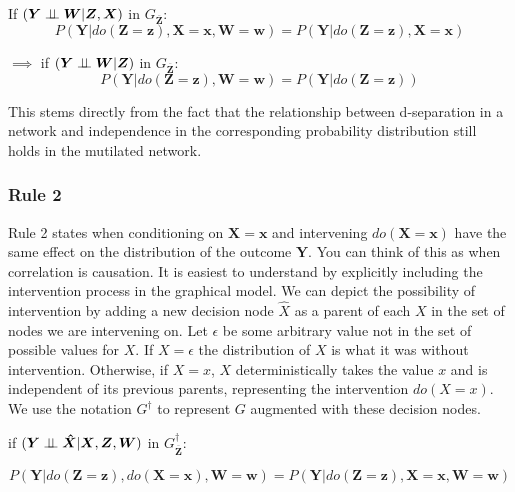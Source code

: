 \documentclass[11pt,a4paper]{article}
\begin{document}
If $(\boldsymbol{Y} \perp\!\!\!\perp \boldsymbol{W} | \boldsymbol{Z},\boldsymbol{X})$ in $G_{\overline{\boldsymbol{Z}}}$:
\begin{equation}
\label{eq:Do1}
 P(\boldsymbol{Y}|do(\boldsymbol{Z}=\boldsymbol{z}),\boldsymbol{X}=\boldsymbol{x},\boldsymbol{W}=\boldsymbol{w}) = P(\boldsymbol{Y}|do(\boldsymbol{Z}=\boldsymbol{z}),\boldsymbol{X}=\boldsymbol{x}) 
\end{equation}

$\implies$ if $(\boldsymbol{Y} \perp\!\!\!\perp \boldsymbol{W} | \boldsymbol{Z})$ in $G_{\overline{\boldsymbol{Z}}}$:
\begin{equation}
\label{eq:Do12}
 P(\boldsymbol{Y}|do(\boldsymbol{Z}=\boldsymbol{z}),\boldsymbol{W}=\boldsymbol{w}) = P(\boldsymbol{Y}|do(\boldsymbol{Z}=\boldsymbol{z})) 
\end{equation}

This stems directly from the fact that the relationship between d-separation in a network and independence in the corresponding probability distribution still holds in the mutilated network. 


\subsubsection{Rule 2}
Rule 2 states when conditioning on $\boldsymbol{X} = \boldsymbol{x}$ and intervening  $do(\boldsymbol{X}=\boldsymbol{x})$ have the same effect on the distribution of the outcome $\boldsymbol{Y}$. You can think of this as when correlation is causation. It is easiest to understand by explicitly including the intervention process in the graphical model. We can depict the possibility of intervention by adding a new decision node $\hat{X}$ as a parent of each $X$ in the set of nodes we are intervening on. Let $\epsilon$ be some arbitrary value not in the set of possible values for $X$. If $X = \epsilon$ the distribution of $X$ is what it was without intervention. Otherwise, if $X=x$, $X$ deterministically takes the value $x$ and is independent of its previous parents, representing the intervention $do(X=x)$. We use the notation $G^{\dagger}$ to represent $G$ augmented with these decision nodes. 

if $(\boldsymbol{Y} \perp\!\!\!\perp \boldsymbol{\hat{X}}|\boldsymbol{X},\boldsymbol{Z},\boldsymbol{W})$ in $G^{\dagger}_{\boldsymbol{\overline{Z}}}$:

\begin{equation}
\label{eq:Do2}
P(\boldsymbol{Y}|do(\boldsymbol{Z}=\boldsymbol{z}),do(\boldsymbol{X}=\boldsymbol{x}),\boldsymbol{W}=\boldsymbol{w}) = P(\boldsymbol{Y}|do(\boldsymbol{Z}=\boldsymbol{z}),\boldsymbol{X}=\boldsymbol{x},\boldsymbol{W}=\boldsymbol{w})
\end{equation}
\end{document}
